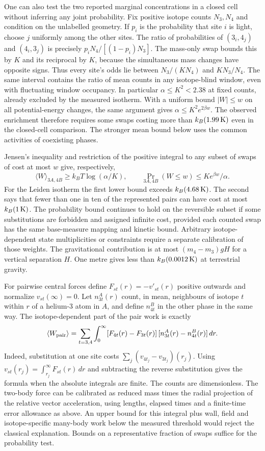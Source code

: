 \documentclass[11pt,a4paper]{article}
\begin{document}
One can also test the two reported marginal concentrations in a closed
cell without inferring any joint probability. Fix positive isotope
counts \(N_3,N_4\) and condition on the unlabelled geometry. If \(p_i\)
is the probability that site \(i\) is light, choose \(j\) uniformly
among the other sites. The ratio of probabilities of \((3_i,4_j)\) and
\((4_i,3_j)\) is precisely \(p_iN_4/[(1-p_i)N_3]\). The mass-only swap
bounds this by \(K\) and its reciprocal by \(K\), because the
simultaneous mass changes have opposite signs. Thus every site's odds
lie between \(N_3/(K N_4)\) and \(K N_3/N_4\). The same interval
contains the ratio of mean counts in any isotope-blind window, even with
fluctuating window occupancy. In particular \(\alpha\le K^2<2.38\) at
fixed counts, already excluded by the measured isotherm. With a uniform
bound \(|W|\le w\) on all potential-energy changes, the same argument
gives \(\alpha\le K^2e^{2\beta w}\). The observed enrichment therefore
requires some swaps costing more than \(k_B(1.99\,{\rm K})\) even in the
closed-cell comparison. The stronger mean bound below uses the common
activities of coexisting phases.

Jensen's inequality and restriction of the positive integral to any
subset of swaps of cost at most \(w\) give, respectively, \[
 \langle W\rangle_{3A,4B}\ge k_BT\log(\alpha/K),\qquad
 \Pr_{3A,4B}(W\le w)\le K e^{\beta w}/\alpha .
\] For the Leiden isotherm the first lower bound exceeds
\(k_B(4.68\,{\rm K})\). The second says that fewer than one in ten of
the represented pairs can have cost at most \(k_B(1\,{\rm K})\). The
probability bound continues to hold on the reversible subset if some
substitutions are forbidden and assigned infinite cost, provided each
counted swap has the same base-measure mapping and kinetic bound.
Arbitrary isotope-dependent state multiplicities or constraints require
a separate calibration of those weights. The gravitational contribution
is at most \((m_4-m_3)gH\) for a vertical separation \(H\). One metre
gives less than \(k_B(0.0012\,{\rm K})\) at terrestrial gravity.

For pairwise central forces define \(F_{st}(r)=-v'_{st}(r)\) positive
outwards and normalize \(v_{st}(\infty)=0\). Let \(n^A_{3t}(r)\) count,
in mean, neighbours of isotope \(t\) within \(r\) of a helium-3 atom in
\(A\), and define \(n^B_{4t}\) in the other phase in the same way. The
isotope-dependent part of the pair work is exactly \[
 \langle W_{\rm pair}\rangle =
 \sum_{t=3,4}\int_0^\infty
 [F_{4t}(r)-F_{3t}(r)]\,[n^A_{3t}(r)-n^B_{4t}(r)]\,dr .
\] Indeed, substitution at one site costs
\(\sum_j(v_{4t_j}-v_{3t_j})(r_j)\). Using
\(v_{st}(r_j)=\int_{r_j}^\infty F_{st}(r)\,dr\) and subtracting the
reverse substitution gives the formula when the absolute integrals are
finite. The counts are dimensionless. The two-body force can be
calibrated as reduced mass times the radial projection of the relative
vector acceleration, using lengths, elapsed times and a finite-time
error allowance as above. An upper bound for this integral plus wall,
field and isotope-specific many-body work below the measured threshold
would reject the classical explanation. Bounds on a representative
fraction of swaps suffice for the probability test.
\end{document}
